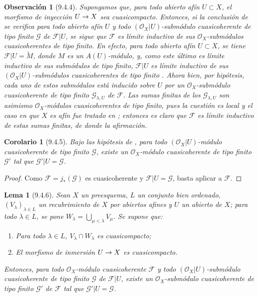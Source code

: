 \documentclass[oneside]{amsart}
\theoremstyle{ega-env-style}
\theoremstyle{ega-thm-env-style}
\newtheorem*{lemma}{Lema}
\newtheorem*{corollary}{Corolario}
\theoremstyle{ega-defn-env-style}
\newtheorem*{remark}{Observación}
\renewcommand{\to}{\mathchoice{\longrightarrow}{\rightarrow}{\rightarrow}{\rightarrow}}
\newcommand{\oldpage}[2][]{{\marginnote{\normalfont{\textbf{#1}~|~#2}}}\ignorespaces}
\let\EGAOriginalLabel\label
\renewcommand{\label}[1]{\phantomsection\EGAOriginalLabel{#1}}
\begin{document}
\begin{remark}[9.4.4]
\label{I.9.4.4}
Supongamos que, para \emph{todo} abierto afín $U\subset X$, el morfismo de inyección
$U\to X$ sea cuasicompacto. Entonces, si la conclusión de  se verifica
para todo abierto afín $U$ y todo $(\mathscr{O}_X|U)$-submódulo cuasicoherente de tipo finito
$\mathscr{G}$ de $\mathscr{F}|U$,
\oldpage[I]{175}
se sigue que $\mathscr{F}$ es límite inductivo de sus $\mathscr{O}_X$-submódulos cuasicoherentes
de tipo finito. En efecto, para todo abierto afín $U\subset X$, se tiene
$\mathscr{F}|U=\widetilde{M}$, donde $M$ es un $A(U)$-módulo, y, como este último es límite
inductivo de sus submódulos de tipo finito, $\mathscr{F}|U$ es límite inductivo de sus
$(\mathscr{O}_X|U)$-submódulos cuasicoherentes de tipo finito . Ahora bien,
por hipótesis, cada uno de estos submódulos está inducido sobre $U$ por un
$\mathscr{O}_X$-submódulo cuasicoherente de tipo finito $\mathscr{G}_{\lambda,U}$ de $\mathscr{F}$.
Las sumas finitas de los $\mathscr{G}_{\lambda,U}$ son asimismo $\mathscr{O}_X$-módulos
cuasicoherentes de tipo finito, pues la cuestión es local y el caso en que $X$ es afín
fue tratado en ; entonces es claro que $\mathscr{F}$ es límite inductivo de
estas sumas finitas, de donde la afirmación.
\end{remark}

\begin{corollary}[9.4.5]
\label{I.9.4.5}
Bajo las hipótesis de , para todo $(\mathscr{O}_X|U)$-módulo cuasicoherente
de tipo finito $\mathscr{G}$, existe un $\mathscr{O}_X$-módulo cuasicoherente de tipo finito
$\mathscr{G}'$ tal que $\mathscr{G}'|U=\mathscr{G}$.
\end{corollary}

\begin{proof}
Como $\mathscr{F}=j_*(\mathscr{G})$ es cuasicoherente  y
$\mathscr{F}|U=\mathscr{G}$, basta aplicar  a $\mathscr{F}$.
\end{proof}

\begin{lemma}[9.4.6]
\label{I.9.4.6}
Sean $X$ un preesquema, $L$ un conjunto bien ordenado,
$(V_\lambda)_{\lambda\in L}$ un recubrimiento de $X$ por abiertos afines y $U$ un
abierto de $X$; para todo $\lambda\in L$, se pone
$W_\lambda=\bigcup_{\mu<\lambda}V_\mu$. Se supone que:
\begin{enumerate}
  \item[\textup{1\textsuperscript{o}}] Para todo $\lambda\in L$,
    $V_\lambda\cap W_\lambda$ es cuasicompacto;
  \item[\textup{2\textsuperscript{o}}] El morfismo de inmersión $U\to X$ es cuasicompacto.
\end{enumerate}
Entonces, para todo $\mathscr{O}_X$-módulo cuasicoherente $\mathscr{F}$ y todo
$(\mathscr{O}_X|U)$-submódulo cuasicoherente \textup{de tipo finito} $\mathscr{G}$ de $\mathscr{F}|U$, existe
un $\mathscr{O}_X$-submódulo cuasicoherente \textup{de tipo finito} $\mathscr{G}'$ de $\mathscr{F}$ tal que
$\mathscr{G}'|U=\mathscr{G}$.
\end{lemma}
\end{document}
